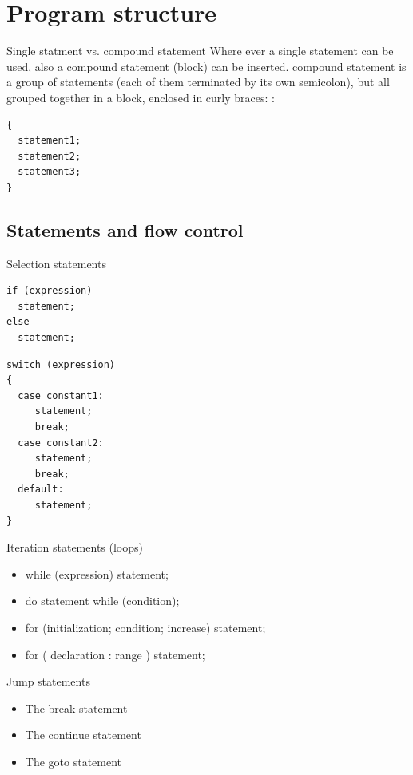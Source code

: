 \documentclass{beamer}
\begin{document}
\section{Program structure}

\begin{frame}[fragile]{Single statment vs. compound statement}
Where ever a single statement can be used, also a compound statement (block) can
be inserted.  compound statement is a group of statements (each of them
terminated by its own semicolon), but all grouped together in a block, enclosed 
in curly braces: {}:
\begin{lstlisting}[caption=Compound statement]
{ 
  statement1; 
  statement2; 
  statement3;
}
\end{lstlisting}
\end{frame}


\subsection{Statements and flow control}
\begin{frame}[fragile]{Selection statements}
\begin{lstlisting}[caption=If and else]
if (expression)
  statement;
else
  statement;
\end{lstlisting}

\begin{lstlisting}[caption=Switch]
switch (expression)
{
  case constant1:
     statement;
     break;
  case constant2:
     statement;
     break;
  default:
     statement;
}
\end{lstlisting}

\end{frame}

\begin{frame}{Iteration statements (loops)}
\begin{itemize}
  \item while (expression) statement;
  \item do statement while (condition);
  \item for (initialization; condition; increase) statement;
  \item for ( declaration : range ) statement;
\end{itemize}
\end{frame}

\begin{frame}{Jump statements}
\begin{itemize}
  \item The break statement
  \item The continue statement
  \item The goto statement
\end{itemize}
\end{frame}
\end{document}
